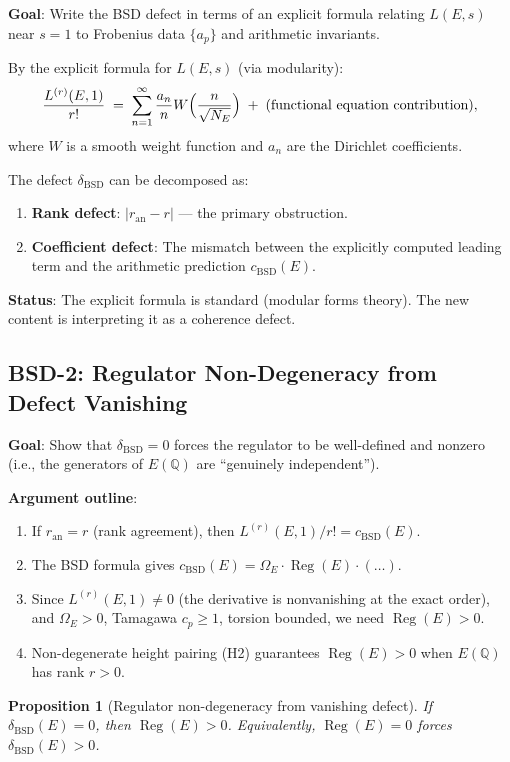 \documentclass[11pt]{article}
\newtheorem{proposition}[lemma]{Proposition}
\theoremstyle{definition}
\DeclareMathOperator{\Reg}{Reg}
\begin{document}
\textbf{Goal}: Write the BSD defect in terms of an explicit formula relating
$L(E,s)$ near $s=1$ to Frobenius data $\{a_p\}$ and arithmetic invariants.

By the explicit formula for $L(E,s)$ (via modularity):
\[
  \frac{L^{(r)}(E, 1)}{r!} \;=\; \sum_{n=1}^{\infty} \frac{a_n}{n} W\Bigl(\frac{n}{\sqrt{N_E}}\Bigr)
  \;+\; \text{(functional equation contribution)},
\]
where $W$ is a smooth weight function and $a_n$ are the Dirichlet coefficients.

The defect $\delta_{\mathrm{BSD}}$ can be decomposed as:
\begin{enumerate}
  \item \textbf{Rank defect}: $|r_{\mathrm{an}} - r|$ --- the primary obstruction.
  \item \textbf{Coefficient defect}: The mismatch between the explicitly computed
    leading term and the arithmetic prediction $c_{\mathrm{BSD}}(E)$.
\end{enumerate}

\textbf{Status}: The explicit formula is standard (modular forms theory).
The new content is interpreting it as a coherence defect.

\subsection{BSD-2: Regulator Non-Degeneracy from Defect Vanishing}

\textbf{Goal}: Show that $\delta_{\mathrm{BSD}} = 0$ forces the regulator to be well-defined
and nonzero (i.e., the generators of $E(\mathbb{Q})$ are ``genuinely independent'').

\textbf{Argument outline}:
\begin{enumerate}
  \item If $r_{\mathrm{an}} = r$ (rank agreement), then $L^{(r)}(E,1) / r! = c_{\mathrm{BSD}}(E)$.
  \item The BSD formula gives $c_{\mathrm{BSD}}(E) = \Omega_E \cdot \Reg(E) \cdot (\ldots)$.
  \item Since $L^{(r)}(E,1) \neq 0$ (the derivative is nonvanishing at the exact order),
    and $\Omega_E > 0$, Tamagawa $c_p \geq 1$, torsion bounded, we need $\Reg(E) > 0$.
  \item Non-degenerate height pairing (H2) guarantees $\Reg(E) > 0$
    when $E(\mathbb{Q})$ has rank $r > 0$.
\end{enumerate}

\begin{proposition}[Regulator non-degeneracy from vanishing defect]
\label{prop:reg-nondeg}
If\/ $\delta_{\mathrm{BSD}}(E) = 0$, then $\Reg(E) > 0$.
Equivalently, $\Reg(E) = 0$ forces $\delta_{\mathrm{BSD}}(E) > 0$.
\end{proposition}
\end{document}
